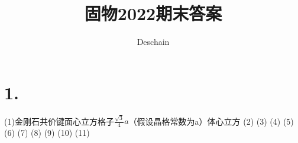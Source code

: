 \documentclass[UTF8]{ctexart}
\title{固物2022期末答案}
\author{Deschain}
\begin{document}
\maketitle
\section*{1.}
(1)金刚石共价键面心立方格子$\frac{\sqrt3}{4}a$（假设晶格常数为a）体心立方
(2)
(3)
(4)
(5)
(6)
(7)
(8)
(9)
(10)
(11)
\end{document}
